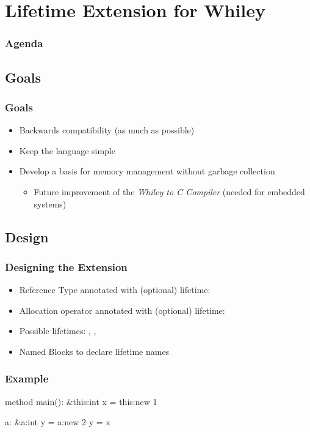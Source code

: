 \section[Extension]{Lifetime Extension for Whiley}

\begin{frame}
	\frametitle{Agenda}
\end{frame}

\subsection{Goals}
\begin{frame}
	\frametitle{Goals}
	\begin{itemize}[<+->]
		\item Backwards compatibility (as much as possible)
		\item Keep the language simple
		\item Develop a basis for memory management without garbage collection
		\begin{itemize}
			\item Future improvement of the \emph{Whiley to C Compiler} (needed for embedded systems)
		\end{itemize}
	\end{itemize}
\end{frame}

\subsection{Design}
\begin{frame}
	\frametitle{Designing the Extension}
	\begin{itemize}[<+->]
		\item Reference Type annotated with (optional) lifetime: 
		\item Allocation operator annotated with (optional) lifetime: 
		\item Possible lifetimes: , \whileyinline{*}, 
		\item Named Blocks to declare lifetime names
	\end{itemize}
\end{frame}

\begin{frame}[fragile]
\frametitle{Example}
\begin{whileycode}
method main():
	&this:int x = this:new 1

	a:
		&a:int y = a:new 2
		y = x
\end{whileycode}
\end{frame}

